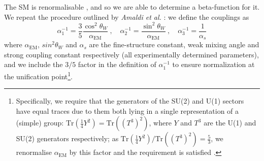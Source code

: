 \documentclass[12pt,a4paper,oneside]{article}
\begin{document}
The SM is renormalisable \cite{sm-renorm}, and so we are able to determine a beta-function for it. We repeat the procedure outlined by \textit{Amaldi et al.} \cite{amaldi}: we define the couplings as
\begin{equation}
\alpha_1^{-1} = \dfrac{3}{5} \dfrac{\cos^2 \theta_W}{\alpha_\mathrm{EM}} \:, \quad
\alpha_2^{-1} = \dfrac{\sin^2 \theta_W}{\alpha_\mathrm{EM}} \:, \quad
\alpha_3^{-1} = \dfrac{1}{\alpha_s}
\label{eqn:coupling-def}
\end{equation}
where $\alpha_\mathrm{EM}$, $sin^2 \theta_W$ and $\alpha_s$ are the fine-structure constant, weak mixing angle and strong coupling constant respectively (all experimentally determined parameters), and we include the $3/5$ factor in the definition of $\alpha_1^{-1}$ to ensure normalization at the unification point\footnote{Specifically, we require that the generators of the SU(2) and U(1) sectors have equal traces due to them both lying in a single representation of a (simple) group: $\mathrm{Tr}(\frac{1}{4} Y^2) = \mathrm{Tr}((T^3)^2)$, where $Y$ and $T^3$ are the U(1) and SU(2) generators respectively; as $\mathrm{Tr}(\frac{1}{4} Y^2) / \mathrm{Tr}((T^3)^2) = \frac{5}{3}$, we renormalise $\alpha_\mathrm{EM}$ by this factor and the requirement is satisfied \cite{5thirds}.}. 
\end{document}
